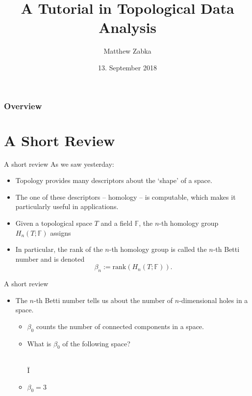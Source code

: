 \documentclass[handout]{beamer}
\title{A Tutorial in Topological Data Analysis} %
\author{Matthew Zabka}
\institute[SMSU] %
{
}
\date{13. September 2018} %
\begin{document}
\begin{frame}
\titlepage %
\end{frame}

\begin{frame}
\frametitle{Overview} %
\tableofcontents 
\end{frame}

\section{A Short Review}
\begin{frame}{A short review}
As we saw yesterday:
\begin{itemize}
\item<2-> Topology provides many descriptors about the `shape' of a space.
\item<3-> The one of these descriptors -- homology -- is computable, which makes it particularly useful in applications.
\item<4-> Given a topological space $T$ and a field $\mathbb{F}$, the $n$-th homology group $H_n(T;\mathbb{F})$ assigns 
\item<5-> In particular, the rank of the $n$-th homology group is called the $n$-th Betti number and is denoted
	\[
	\beta_n := \textrm{rank}(H_n(T;\mathbb{F})).
	\]
\end{itemize}
\end{frame}
\begin{frame}{A short review}
\begin{itemize}
\item The $n$-th Betti number tells us about the number of $n$-dimensional holes in a space.
	\begin{itemize}
	\item<2-> $\beta_0$ counts the number of connected components in a space.
	\item<3-> What is $\beta_0$ of the following space?\\
	\
	\begin{center}
	{\fontsize{50pt}{1pt}\selectfont \={I}}
	\end{center}
	\item<4-> $\beta_0 = 3$
	\end{itemize}
\end{itemize}
\end{frame}
\end{document}
